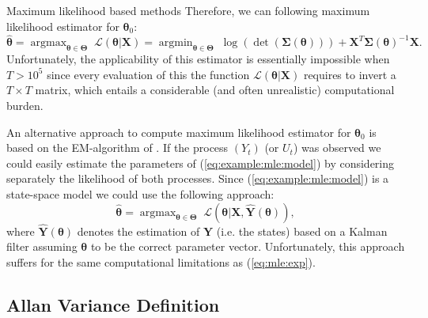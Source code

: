 \documentclass[envcountsect,usenames,dvipsnames]{beamer}
\DeclareMathOperator*{\argmax}{argmax}
\DeclareMathOperator*{\argmin}{argmin}
\def\btheta{\bm \theta}
\def\bTheta{\bm \Theta}
\theoremstyle{mystyle}
\begin{document}
\begin{frame}{Maximum likelihood based methods}
\footnotesize
    Therefore, we can following maximum likelihood estimator for $\btheta_0$:
    \begin{equation}
        \hat{\btheta} = \argmax_{\btheta \in \bTheta} \; \mathcal{L}\left(\btheta | \mathbf{X} \right) = \argmin_{\btheta \in \bTheta} \; \log \left( \det \left( \bm{\Sigma}(\btheta) \right)\right)  +  \mathbf{X}^T \bm{\Sigma}(\btheta)^{-1} \mathbf{X}.
        \label{eq:mle:exp}
    \end{equation}
    Unfortunately, the applicability of this estimator is essentially impossible when $T > 10^5$ since every evaluation of this the function $\mathcal{L}\left(\btheta | \mathbf{X} \right)$ requires to invert a $T \times T$ matrix, which entails a considerable (and often unrealistic) computational burden.
    
    \vspace{0.25cm}
    
    An alternative approach to compute maximum likelihood estimator for $\btheta_0$ is based on the EM-algorithm of \cite{dempster1977maximum}. If the process $(Y_t)$ (or $U_t$) was observed we could easily estimate the parameters of  (\ref{eq:example:mle:model}) by considering separately the likelihood of both processes. Since (\ref{eq:example:mle:model}) is a state-space model we could use the following approach:
    \begin{equation*}
        \hat{\btheta} = \argmax_{\btheta \in \bTheta} \; \mathcal{L}\left(\btheta | \mathbf{X}, \hat{\mathbf{Y}}(\btheta) \right),
    \end{equation*}
    where $\hat{\mathbf{Y}}(\btheta)$ denotes the estimation of $\mathbf{Y}$ (i.e. the states) based on a Kalman filter assuming $\btheta$ to be the correct parameter vector. Unfortunately, this approach suffers for the same computational limitations as (\ref{eq:mle:exp}).
\end{frame}

\subsection{Allan Variance Definition}
\end{document}
